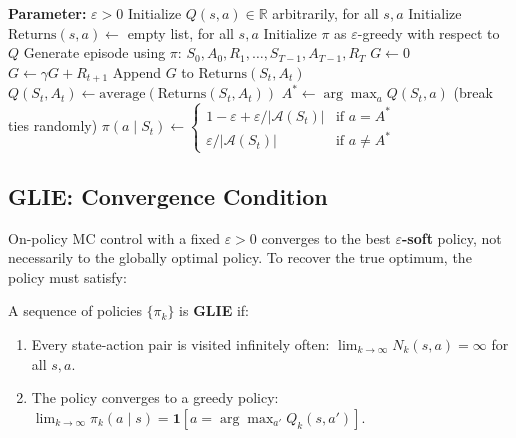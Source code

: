 \documentclass[11pt,a4paper]{article}
\theoremstyle{definition}
\theoremstyle{plain}
\theoremstyle{remark}
\begin{document}
\begin{algorithm}
\caption{On-Policy First-Visit MC Control (for $\varepsilon$-soft policies), estimating $\pi \approx \pi_*$}
\begin{algorithmic}
\STATE \textbf{Parameter:} $\varepsilon > 0$
\STATE Initialize $Q(s, a) \in \mathbb{R}$ arbitrarily, for all $s, a$
\STATE Initialize $\text{Returns}(s, a) \leftarrow$ empty list, for all $s, a$
\STATE Initialize $\pi$ as $\varepsilon$-greedy with respect to $Q$
\LOOP
    \STATE Generate episode using $\pi$: $S_0, A_0, R_1, \ldots, S_{T-1}, A_{T-1}, R_T$
    \STATE $G \leftarrow 0$
        \STATE $G \leftarrow \gamma G + R_{t+1}$
            \STATE Append $G$ to $\text{Returns}(S_t, A_t)$
            \STATE $Q(S_t, A_t) \leftarrow \text{average}(\text{Returns}(S_t, A_t))$
            \STATE $A^* \leftarrow \arg\max_a Q(S_t, a)$ (break ties randomly)
                \STATE $\pi(a \mid S_t) \leftarrow \begin{cases}
                    1 - \varepsilon + \varepsilon / |\mathcal{A}(S_t)| & \text{if } a = A^* \\
                    \varepsilon / |\mathcal{A}(S_t)| & \text{if } a \neq A^*
                \end{cases}$
            \ENDFOR
        \ENDIF
    \ENDFOR
\ENDLOOP
\end{algorithmic}
\end{algorithm}

\subsection{GLIE: Convergence Condition}

On-policy MC control with a fixed $\varepsilon > 0$ converges to the best \textbf{$\varepsilon$-soft} policy, not necessarily to the globally optimal policy. To recover the true optimum, the policy must satisfy:

\begin{tcolorbox}[colback=blue!5!white, colframe=blue!60!black, title={GLIE — Greedy in the Limit with Infinite Exploration}]
A sequence of policies $\{\pi_k\}$ is \textbf{GLIE} if:
\begin{enumerate}
    \item Every state-action pair is visited infinitely often: $\lim_{k \to \infty} N_k(s,a) = \infty$ for all $s, a$.
    \item The policy converges to a greedy policy: $\lim_{k \to \infty} \pi_k(a \mid s) = \mathbf{1}[a = \arg\max_{a'} Q_k(s, a')]$.
\end{enumerate}
\end{tcolorbox}
\end{document}
